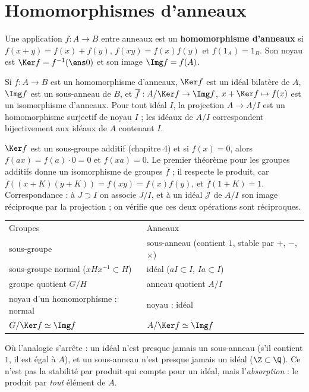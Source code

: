 \section{Homomorphismes d'anneaux}
\begin{definition}
Une application $f:A\to B$ entre anneaux est un \textbf{homomorphisme d'anneaux} si $f(x+y)=f(x)+f(y)$, $f(xy)=f(x)f(y)$ et $f(1_A)=1_B$. Son noyau est $\Ker f=f^{-1}(\ens0)$ et son image $\Img f=f(A)$.
\end{definition}
\begin{theoreme}\label{thm-iso-anneaux}
Si $f:A\to B$ est un homomorphisme d'anneaux, $\Ker f$ est un idéal bilatère de $A$, $\Img f$ est un sous-anneau de $B$, et $\overline f:A/\Ker f\to\Img f$, $x+\Ker f\mapsto f(x)$ est un isomorphisme d'anneaux. Pour tout idéal $I$, la projection $A\to A/I$ est un homomorphisme surjectif de noyau $I$ ; les idéaux de $A/I$ correspondent bijectivement aux idéaux de $A$ contenant $I$.
\end{theoreme}
\begin{preuve}
$\Ker f$ est un sous-groupe additif (chapitre 4) et si $f(x)=0$, alors $f(ax)=f(a)\cdot0=0$ et $f(xa)=0$. Le premier théorème pour les groupes additifs donne un isomorphisme de groupes $\overline f$ ; il respecte le produit, car $\overline f((x+K)(y+K))=f(xy)=f(x)f(y)$, et $\overline f(1+K)=1$. Correspondance : à $J\supset I$ on associe $J/I$, et à un idéal $\mathcal J$ de $A/I$ son image réciproque par la projection ; on vérifie que ces deux opérations sont réciproques.
\end{preuve}
\begin{essentiel}
\begin{tabular}{ll}
Groupes & Anneaux \\
sous-groupe & sous-anneau (contient $1$, stable par $+$, $-$, $\times$) \\
sous-groupe normal ($xHx^{-1}\subset H$) & idéal ($aI\subset I$, $Ia\subset I$) \\
groupe quotient $G/H$ & anneau quotient $A/I$ \\
noyau d'un homomorphisme : normal & noyau : idéal \\
$G/\Ker f\simeq\Img f$ & $A/\Ker f\simeq\Img f$ \\
\end{tabular}
Où l'analogie s'arrête : un idéal n'est presque jamais un sous-anneau (s'il contient $1$, il est égal à $A$), et un sous-anneau n'est presque jamais un idéal ($\Z\subset\Q$). Ce n'est pas la stabilité par produit qui compte pour un idéal, mais l'\emph{absorption} : le produit par \emph{tout} élément de $A$.
\end{essentiel}

